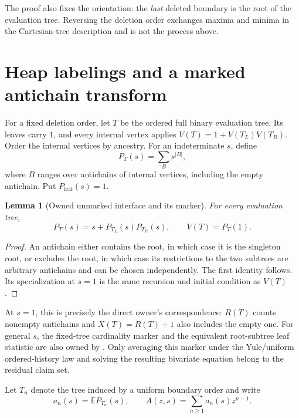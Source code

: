\documentclass[10pt,a4paper]{amsart}
\newtheorem{lemma}[theorem]{Lemma}
\theoremstyle{definition}
\theoremstyle{remark}
\newcommand{\E}{\mathbb E}
\begin{document}
The proof also fixes the orientation: the \emph{last} deleted boundary is the
root of the evaluation tree.  Reversing the deletion order exchanges maxima
and minima in the Cartesian-tree description and is not the process above.

\section{Heap labelings and a marked antichain transform}

For a fixed deletion order, let $T$ be the ordered full binary evaluation
tree.  Its leaves carry $1$, and every internal vertex applies
$V(T)=1+V(T_L)V(T_R)$.  Order the internal vertices by ancestry.  For an
indeterminate $s$, define
\[
 P_T(s)=\sum_{B} s^{|B|},
\]
where $B$ ranges over antichains of internal vertices, including the empty
antichain.  Put $P_{\mathrm{leaf}}(s)=1$.

\begin{lemma}[Owned unmarked interface and its marker]\label{lem:antichain}
For every evaluation tree,
\begin{equation}\label{eq:treepoly}
 P_T(s)=s+P_{T_L}(s)P_{T_R}(s),\qquad V(T)=P_T(1).
\end{equation}
\end{lemma}

\begin{proof}
An antichain either contains the root, in which case it is the singleton
root, or excludes the root, in which case its restrictions to the two
subtrees are arbitrary antichains and can be chosen independently.  The
first identity follows.  Its specialization at $s=1$ is the same recursion
and initial condition as $V(T)$.
\end{proof}

At $s=1$, this is precisely the direct owner's correspondence: $R(T)$
counts nonempty antichains and $X(T)=R(T)+1$ also includes the empty one.
For general $s$, the fixed-tree cardinality marker and the equivalent
root-subtree leaf statistic are also owned by
\citet{AndriantianaWagnerWang2013}.  Only averaging this marker under the
Yule/uniform ordered-history law and solving the resulting bivariate equation
belong to the residual claim set.

Let $T_n$ denote the tree induced by a uniform boundary order and write
\[
 a_n(s)=\E P_{T_n}(s),\qquad
 A(z,s)=\sum_{n\geq1}a_n(s)z^{n-1}.
\]
\end{document}
